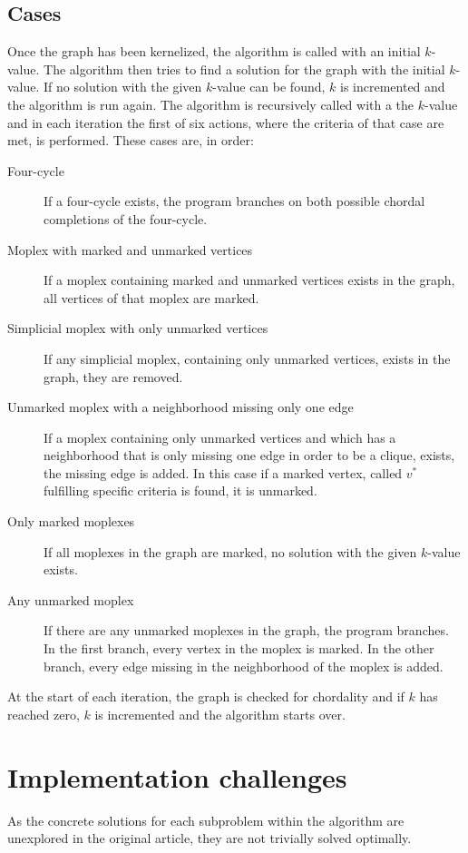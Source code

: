 \documentclass{article}
\begin{document}
		\subsection{Cases} 
		Once the graph has been kernelized, the algorithm is called with an initial $k$-value. The algorithm then tries to find a solution for the graph with the initial $k$-value.
		If no solution with the given $k$-value can be found, $k$ is incremented and the algorithm is run again.
		The algorithm is recursively called with a the $k$-value and in each iteration the first of six actions, where the criteria of that case are met, is performed.
		These cases are, in order:
		\begin{description}
			\item[Four-cycle] If a four-cycle exists, the program branches on both possible chordal completions of the four-cycle.
			\item[Moplex with marked and unmarked vertices] If a moplex containing marked and unmarked vertices exists in the graph, all vertices of that moplex are marked.
			\item[Simplicial moplex with only unmarked vertices] If any simplicial moplex, containing only unmarked vertices, exists in the graph, they are removed.
			\item[Unmarked moplex with a neighborhood missing only one edge] If a moplex containing only unmarked vertices and which has a neighborhood that is only missing one edge in order to be a clique, exists, the missing edge is added. In this case if a marked vertex, called $v^*$ fulfilling specific criteria is found, it is unmarked.
			\item[Only marked moplexes] If all moplexes in the graph are marked, no solution with the given $k$-value exists.
			\item[Any unmarked moplex] If there are any unmarked moplexes in the graph, the program branches. In the first branch, every vertex in the moplex is marked. In the other branch, every edge missing in the neighborhood of the moplex is added.
		\end{description}

		At the start of each iteration, the graph is checked for chordality and if $k$ has reached zero, $k$ is incremented and the algorithm starts over.

	\section{Implementation challenges}
	As the concrete solutions for each subproblem within the algorithm are unexplored in the original article, they are not trivially solved optimally.
\end{document}
